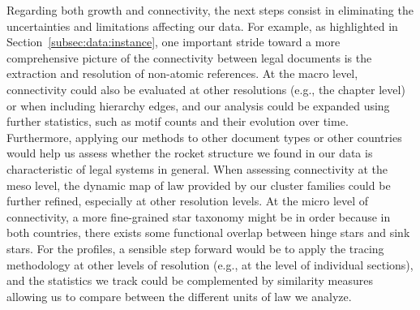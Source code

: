 \documentclass[utf8,sort&compress,table,hidelinks]{frontiersFPHY} %
\begin{document}
Regarding both growth and connectivity, the next steps consist in eliminating the uncertainties and limitations affecting our data.
For example, as highlighted in Section~\ref{subsec:data:instance}, one important stride toward a more comprehensive picture of the connectivity between legal documents is the extraction and resolution of non-atomic references.
At the macro level, connectivity could also be evaluated at other resolutions (e.g., the chapter level) or when including hierarchy edges, 
and our analysis could be expanded using further statistics, such as motif counts and their evolution over time.
Furthermore, applying our methods to other document types or other countries would help us assess whether the rocket structure we found in our data is characteristic of legal systems in general.
When assessing connectivity at the meso level, the dynamic map of law provided by our cluster families could be further refined, especially at other resolution levels.
At the micro level of connectivity, a more fine-grained star taxonomy might be in order because in both countries, there exists some functional overlap between hinge stars and sink stars.
For the profiles, a sensible step forward would be to apply the tracing methodology at other levels of resolution (e.g., at the level of individual sections), and the statistics we track could be complemented by similarity measures allowing us to compare between the different units of law we analyze.
\end{document}
